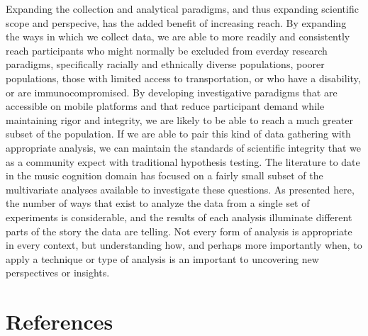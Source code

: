 \documentclass[
  english,
  man,floatsintext]{apa6}
\begin{document}
Expanding the collection and analytical paradigms, and thus expanding scientific scope and perspecive, has the added benefit of increasing reach. By expanding the ways in which we collect data, we are able to more readily and consistently reach participants who might normally be excluded from everday research paradigms, specifically racially and ethnically diverse populations, poorer populations, those with limited access to transportation, or who have a disability, or are immunocompromised.
By developing investigative paradigms that are accessible on mobile platforms and that reduce participant demand while maintaining rigor and integrity, we are likely to be able to reach a much greater subset of the population. If we are able to pair this kind of data gathering with appropriate analysis, we can maintain the standards of scientific integrity that we as a community expect with traditional hypothesis testing. The literature to date in the music cognition domain has focused on a fairly small subset of the multivariate analyses available to investigate these questions. As presented here, the number of ways that exist to analyze the data from a single set of experiments is considerable, and the results of each analysis illuminate different parts of the story the data are telling. Not every form of analysis is appropriate in every context, but understanding how, and perhaps more importantly when, to apply a technique or type of analysis is an important to uncovering new perspectives or insights.

\newpage

\hypertarget{references}{%
\section{References}\label{references}}

\begingroup
\setlength{\parindent}{-0.5in}
\setlength{\leftskip}{0.5in}
\end{document}
